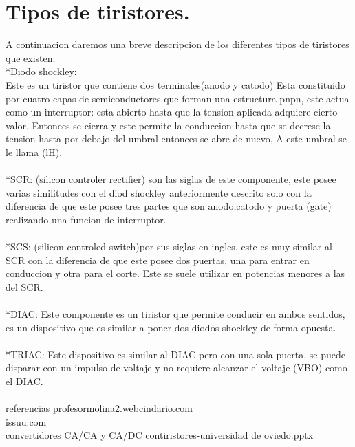 \documentclass[12pt]{article}
\begin{document}
\section{Tipos de tiristores.}
A continuacion daremos una breve descripcion de los diferentes tipos de tiristores que existen:\\
*Diodo shockley:\\
Este es un tiristor que contiene dos terminales(anodo y catodo) Esta constituido por cuatro capas de semiconductores que forman una estructura pnpn,
este actua como un interruptor: esta abierto hasta que la tension aplicada adquiere cierto valor, Entonces se cierra y este permite la conduccion hasta que se decrese la tension hasta por debajo del umbral  entonces se abre  de nuevo, A este  umbral se le llama (lH).\\\\
*SCR:
(silicon controler rectifier) son las siglas de este componente, este posee varias similitudes con el diod shockley anteriormente descrito solo con la diferencia de que  este posee tres partes que son anodo,catodo y puerta (gate)
realizando una funcion de interruptor.\\\\
*SCS:
(silicon controled switch)por sus siglas en ingles, este es muy similar al SCR con la diferencia de que este posee dos puertas, una para entrar en conduccion y otra para el corte. Este se suele utilizar en potencias menores a las del SCR.\\\\
*DIAC:
Este componente es un tiristor que permite conducir en ambos sentidos, es un dispositivo que es similar a poner dos diodos shockley de forma opuesta.\\\\
*TRIAC:
Este dispositivo es similar al DIAC pero con una sola puerta, se puede disparar con un impulso de voltaje y no  requiere alcanzar el voltaje (VBO) como el DIAC.\\\\ 

referencias
profesormolina2.webcindario.com
\\issuu.com
\\convertidores CA/CA y CA/DC contiristores-universidad de oviedo.pptx
\end{document}
